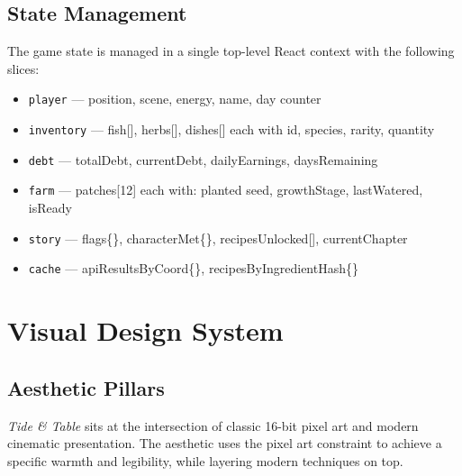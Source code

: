 \documentclass[11pt, letterpaper]{article}
\begin{document}
\subsection{State Management}

The game state is managed in a single top-level React context with the following slices:

\begin{itemize}
  \item \texttt{player} --- position, scene, energy, name, day counter
  \item \texttt{inventory} --- fish[], herbs[], dishes[] each with id, species, rarity, quantity
  \item \texttt{debt} --- totalDebt, currentDebt, dailyEarnings, daysRemaining
  \item \texttt{farm} --- patches[12] each with: planted seed, growthStage, lastWatered, isReady
  \item \texttt{story} --- flags\{\}, characterMet\{\}, recipesUnlocked[], currentChapter
  \item \texttt{cache} --- apiResultsByCoord\{\}, recipesByIngredientHash\{\}
\end{itemize}

\newpage
\section{Visual Design System}

\subsection{Aesthetic Pillars}

\textit{Tide \& Table} sits at the intersection of classic 16-bit pixel art and modern cinematic presentation. The aesthetic uses the pixel art constraint to achieve a specific warmth and legibility, while layering modern techniques on top.
\end{document}

